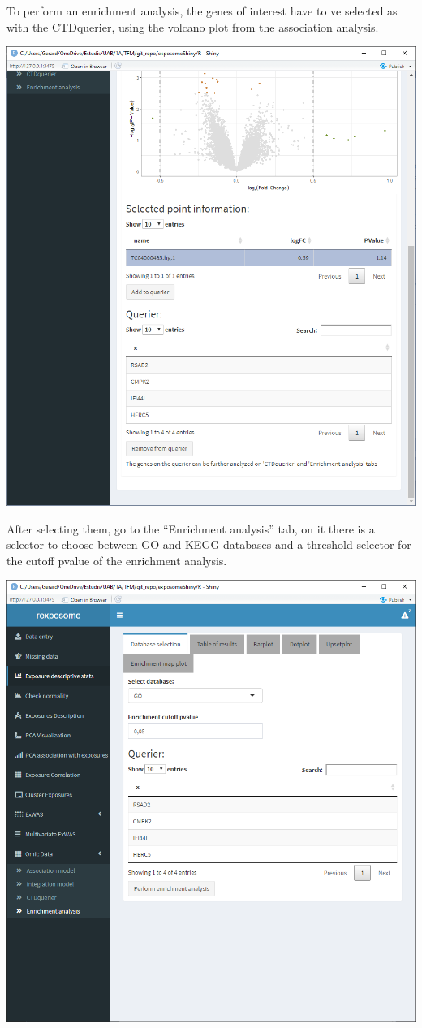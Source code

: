 \documentclass[
]{book}
\begin{document}
To perform an enrichment analysis, the genes of interest have to ve selected as with the CTDquerier, using the volcano plot from the association analysis.

\includegraphics{images/analysis10_2.png}

After selecting them, go to the ``Enrichment analysis'' tab, on it there is a selector to choose between GO and KEGG databases and a threshold selector for the cutoff pvalue of the enrichment analysis.

\includegraphics{images/analysis11_1.png}
\end{document}
